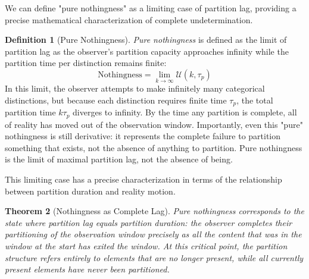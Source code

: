 \documentclass[12pt,a4paper]{article}
\newtheorem{theorem}{Theorem}[section]
\theoremstyle{definition}
\newtheorem{definition}[theorem]{Definition}
\theoremstyle{remark}
\begin{document}
We can define "pure nothingness" as a limiting case of partition lag, providing a precise mathematical characterization of complete undetermination.

\begin{definition}[Pure Nothingness]
\label{def:pure_nothingness}
\emph{Pure nothingness} is defined as the limit of partition lag as the observer's partition capacity approaches infinity while the partition time per distinction remains finite:
\begin{equation}
    \text{Nothingness} = \lim_{k \to \infty} \mathcal{U}(k, \tau_p)
\end{equation}
In this limit, the observer attempts to make infinitely many categorical distinctions, but because each distinction requires finite time $\tau_p$, the total partition time $k\tau_p$ diverges to infinity. By the time any partition is complete, all of reality has moved out of the observation window. Importantly, even this "pure" nothingness is still derivative: it represents the complete failure to partition something that exists, not the absence of anything to partition. Pure nothingness is the limit of maximal partition lag, not the absence of being.
\end{definition}

This limiting case has a precise characterization in terms of the relationship between partition duration and reality motion.

\begin{theorem}[Nothingness as Complete Lag]
\label{thm:nothingness_complete_lag}
Pure nothingness corresponds to the state where partition lag equals partition duration: the observer completes their partitioning of the observation window precisely as all the content that was in the window at the start has exited the window. At this critical point, the partition structure refers entirely to elements that are no longer present, while all currently present elements have never been partitioned.
\end{theorem}
\end{document}
